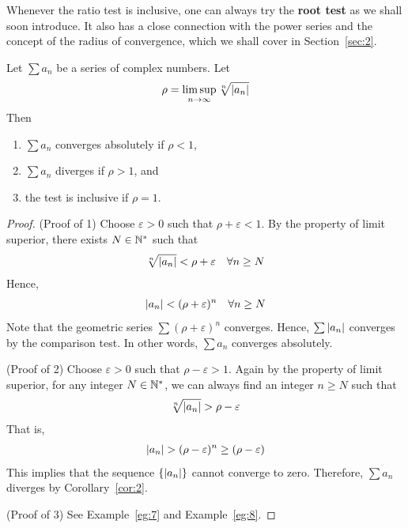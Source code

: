 \documentclass[thmcnt=section, 12pt]{my-elegantbook}
\begin{document}

Whenever the ratio test is inclusive, one can always try the \textbf{root test} as we shall soon introduce. It also has a close connection with the power series and the concept of the radius of convergence, which we shall cover in Section~\ref{sec:2}.

\begin{theorem} \label{thm:55}
    Let $\sum a_n$ be a series of complex numbers. Let 
    \begin{align*}
        \rho = \limsup_{n \to \infty} \sqrt[n]{\left\lvert a_n \right\rvert}
    \end{align*}
    Then
    \begin{enumerate}
        \item $\sum a_n$ converges absolutely if $\rho < 1$,
        \item $\sum a_n$ diverges if $\rho > 1$, and 
        \item the test is inclusive if $\rho = 1$.
    \end{enumerate}
\end{theorem}

\begin{proof}
    (Proof of 1) Choose $\varepsilon > 0$ such that $\rho + \varepsilon < 1$. By the property of limit superior, there exists $N \in \mathbb{N}^\ast$ such that 
    \begin{align*}
        \sqrt[n]{\left\lvert a_n \right\rvert} < \rho + \varepsilon
        \quad \forall n \geq N
    \end{align*}
    Hence, 
    \begin{align*}
        \left\lvert a_n \right\rvert < (\rho+\varepsilon)^n
        \quad \forall n \geq N
    \end{align*}
    Note that the geometric series $\sum (\rho+\varepsilon)^n$ converges. Hence, $\sum \left\lvert a_n \right\rvert$ converges by the comparison test. In other words, $\sum a_n$ converges absolutely.

    (Proof of 2) Choose $\varepsilon > 0$ such that $\rho-\varepsilon > 1$. Again by the property of limit superior, for any integer $N \in \mathbb{N}^\ast$, we can always find an integer $n \geq N$ such that 
    \begin{align*}
        \sqrt[n]{\left\lvert a_n \right\rvert} > \rho - \varepsilon
    \end{align*}
    That is, 
    \begin{align*}
        \left\lvert a_n \right\rvert > (\rho - \varepsilon)^n 
        \geq (\rho - \varepsilon)
    \end{align*}
    This implies that the sequence $\{\left\lvert a_n \right\rvert\}$ cannot converge to zero. Therefore, $\sum a_n$ diverges by Corollary~\ref{cor:2}.

    (Proof of 3) See Example~\ref{eg:7} and Example~\ref{eg:8}.
\end{proof}
\end{document}
